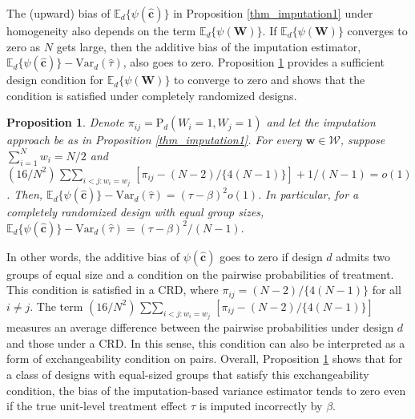 \documentclass[12pt]{article}
\newcommand{\Var}{{\text{Var}}}
\newcommand{\E}{{\mathbb{E}}}
\renewcommand{\Pr}{{\text{P}}}
\newtheorem{proposition}[theorem]{Proposition}
\begin{document}
The (upward) bias of $\E_d\{\psi(\hat{\bm{c}})\}$ in Proposition \ref{thm_imputation1} under homogeneity also depends on the term $\E_d\{\psi(\bm{W})\}$. If $\E_d\{\psi(\bm{W})\}$ converges to zero as $N$ gets large, then the additive bias of the imputation estimator, $\E_d\{\psi(\hat{\bm{c}})\} - \Var_d(\hat{\tau})$, also goes to zero. Proposition \ref{prop_limit} provides a sufficient design condition for $\E_d\{\psi(\bm{W})\}$ to converge to zero and shows that the condition is satisfied under completely randomized designs.
\begin{proposition} \normalfont
Denote $\pi_{ij} = \Pr_d(W_i = 1, W_j  =1)$ and let the imputation approach be as in Proposition \ref{thm_imputation1}. For every $\bm{w} \in \mathcal{W}$, suppose $\sum_{i=1}^{N}w_i = N/2$ and $(16/N^2)\mathop{\sum\sum}_{i<j:w_i = w_j}[\pi_{ij} - (N-2)/\{4(N-1)\}] + 1/(N-1) = o(1)$. Then, $\E_d\{\psi(\hat{\bm{c}})\} - \Var_d(\hat{\tau}) = (\tau - \beta)^2 o\left(1\right).$
In particular, for a completely randomized design with equal group sizes, $\E_d\{\psi(\hat{\bm{c}})\} - \Var_d(\hat{\tau}) = (\tau - \beta)^2 /(N-1).$
     \label{prop_limit}
\end{proposition}
In other words, the additive bias of $\psi(\hat{\bm{c}})$ goes to zero if design $d$ admits two groups of equal size and a condition on the pairwise probabilities of treatment. 
This condition is satisfied in a CRD, where $\pi_{ij} = (N-2)/\{4(N-1)\}$ for all $i \neq j$. The term $(16/N^2)\mathop{\sum\sum}_{i<j:w_i = w_j}[\pi_{ij} - (N-2)/\{4(N-1)\}]$ measures an average difference between the pairwise probabilities under design $d$ and those under a CRD. 
In this sense, this condition can also be interpreted as a form of exchangeability condition on pairs. Overall, Proposition \ref{prop_limit} shows that for a class of designs with equal-sized groups that satisfy this exchangeability condition, the bias of the imputation-based variance estimator tends to zero even if the true unit-level treatment effect $\tau$ is imputed incorrectly by $\beta$.
    
\end{document}
